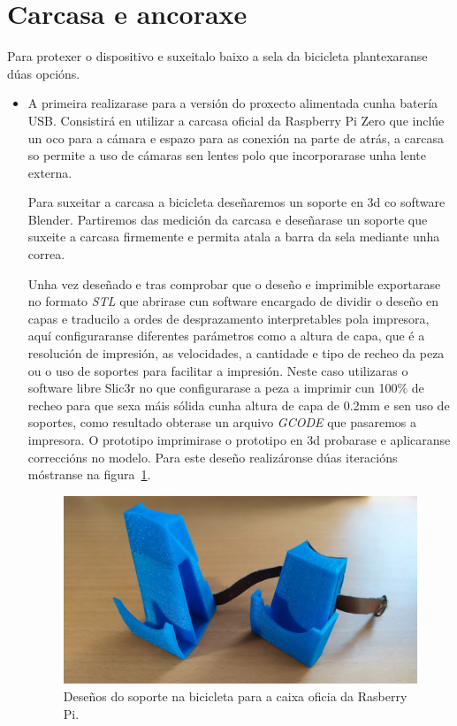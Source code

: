 \section{Carcasa e ancoraxe}

Para protexer o dispositivo e suxeitalo baixo a sela da bicicleta plantexaranse dúas opcións.
\begin{itemize}
    \item A primeira realizarase para a versión do proxecto alimentada cunha batería USB. Consistirá en utilizar a carcasa oficial da Raspberry Pi Zero que inclúe un oco para a cámara e espazo para as conexión na parte de atrás, a carcasa so permite a uso de cámaras sen lentes polo que incorporarase unha lente externa.

    Para suxeitar a carcasa a bicicleta deseñaremos un soporte en 3d co software Blender. Partiremos das medición da carcasa e deseñarase un soporte que suxeite a carcasa firmemente e permita atala a barra da sela mediante unha correa.

    Unha vez deseñado e tras comprobar que o deseño e imprimible exportarase no formato \emph{STL} que abrirase cun software encargado de dividir o deseño en capas e traducilo a ordes de desprazamento interpretables pola impresora, aquí configuraranse diferentes parámetros como a altura de capa, que é a resolución de impresión, as velocidades, a cantidade e tipo de recheo da peza ou o uso de soportes para facilitar a impresión. Neste caso utilizaras o software libre Slic3r no que configurarase a peza a imprimir cun 100\(\%\) de recheo para que sexa máis sólida cunha altura de capa de 0.2mm e sen uso de soportes, como resultado obterase un arquivo \emph{GCODE}  que pasaremos a impresora. O prototipo imprimirase o prototipo en 3d probarase e aplicaranse correccións no modelo. Para este deseño realizáronse dúas iteracións móstranse na figura~\ref{fig:soporte_caixa}.

    \begin{figure}[tb]
      \centering
      \includegraphics[scale=.1]{imaxes/soporte-caixa.jpg}
      \caption{Deseños do soporte na bicicleta para a caixa oficia da Rasberry Pi.}
      \label{fig:soporte_caixa}
    \end{figure}



\end{itemize}
